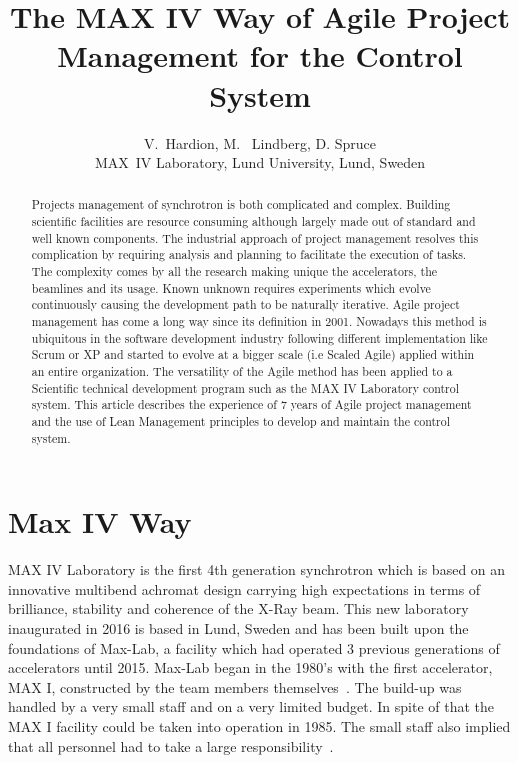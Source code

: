 \documentclass[a4paper,
              ]{jacow}
\begin{document}
\newtheorem{definition}{Definition} 

\title{The MAX IV Way of Agile Project Management for the Control System}

\author{V.~Hardion, M. ~Lindberg, D. Spruce
\\
MAX~IV Laboratory, Lund University, Lund, Sweden
}

\maketitle

%
\begin{abstract}
Projects management of synchrotron is both complicated and complex. Building scientific facilities are resource consuming although largely made out of standard and well known components. The industrial approach of project management resolves this complication by requiring analysis and planning to facilitate the execution of tasks. The complexity comes by all the research making unique the accelerators, the beamlines and its usage. Known unknown requires experiments which evolve continuously causing the development path to be naturally iterative. Agile project management has come a long way since its definition in 2001. Nowadays this method is ubiquitous in the software development industry following different implementation like Scrum or XP and started to evolve at a bigger scale (i.e Scaled Agile) applied within an entire organization. The versatility of the Agile method has been applied to a Scientific technical development program such as the MAX IV Laboratory control system. This article describes the experience of 7 years of Agile project management and the use of Lean Management principles to develop and maintain the control system.
\end{abstract}

\section{Max IV Way}
MAX IV Laboratory is the first 4th generation synchrotron which is based on an innovative multibend achromat design carrying high expectations in terms of brilliance, stability and coherence of the X-Ray beam. This new laboratory inaugurated in 2016 is based in Lund, Sweden and has been built upon the foundations of Max-Lab, a facility which had operated 3 previous generations of accelerators until 2015.
Max-Lab began in the 1980's with the first accelerator, MAX I, constructed by the team members themselves~\cite{maxiv-history}. The build-up was handled by a very small staff and on a very limited budget. In spite of that the MAX I facility could be taken into operation in 1985. The small staff also implied that all personnel had to take a large responsibility~\cite{martensson}.
\end{document}
